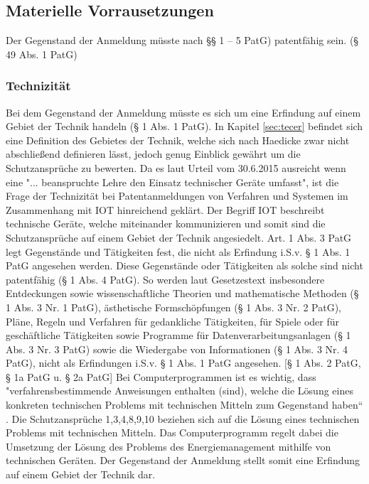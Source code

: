 \subsection{Materielle Vorrausetzungen}
Der Gegenstand der Anmeldung müsste nach §§ 1 – 5 PatG) patentfähig sein. (§ 49 Abs. 1 PatG)

\subsubsection{Technizität}
Bei dem Gegenstand der Anmeldung müsste es sich um eine Erfindung auf einem Gebiet der Technik
handeln (§ 1 Abs. 1 PatG).
In Kapitel \ref{sec:tecer} befindet sich eine Definition des Gebietes 
der Technik, welche sich nach Haedicke zwar nicht abschließend definieren
lässt, jedoch genug Einblick gewährt um die Schutzansprüche zu bewerten.
Da es laut Urteil vom 30.6.2015 \cite{BGH3020152015} ausreicht wenn 
eine "... beanspruchte Lehre den Einsatz technischer Geräte umfasst", ist
die Frage der Technizität bei Patentanmeldungen von Verfahren und 
Systemen im Zusammenhang mit IOT hinreichend geklärt.
Der Begriff IOT beschreibt technische Geräte, welche miteinander 
kommunizieren und somit sind die Schutzansprüche auf einem Gebiet der Technik
angesiedelt.
Art. 1 Abs. 3 PatG legt Gegenstände und Tätigkeiten fest, die nicht als Erfindung i.S.v. § 1 Abs. 1 PatG
angesehen werden. Diese Gegenstände oder Tätigkeiten als solche sind nicht patentfähig (§ 1 Abs. 4
PatG). So werden laut Gesetzestext insbesondere
Entdeckungen sowie wissenschaftliche Theorien und mathematische Methoden (§ 1 Abs. 3 Nr. 1
PatG),
ästhetische Formschöpfungen (§ 1 Abs. 3 Nr. 2 PatG),
Pläne, Regeln und Verfahren für gedankliche Tätigkeiten, für Spiele oder für geschäftliche Tätigkeiten
sowie Programme für Datenverarbeitungsanlagen (§ 1 Abs. 3 Nr. 3 PatG) sowie
die Wiedergabe von Informationen (§ 1 Abs. 3 Nr. 4 PatG),
nicht als Erfindungen i.S.v. § 1 Abs. 1 PatG angesehen.
[§ 1 Abs. 2 PatG, § 1a PatG u. § 2a PatG]
Bei Computerprogrammen ist es wichtig, dass 
"verfahrensbestimmende Anweisungen enthalten (sind), welche die Lösung eines konkreten
technischen Problems mit technischen Mitteln zum Gegenstand haben“ \cite{BGH2020092009}.
Die Schutzansprüche 1,3,4,8,9,10 beziehen sich auf die Lösung eines technischen Problems
mit technischen Mitteln. Das Computerprogramm regelt dabei die Umsetzung der 
Lösung des Problems des Energiemanagement mithilfe von technischen Geräten.
Der Gegenstand der Anmeldung stellt somit eine Erfindung auf einem Gebiet der Technik dar.



